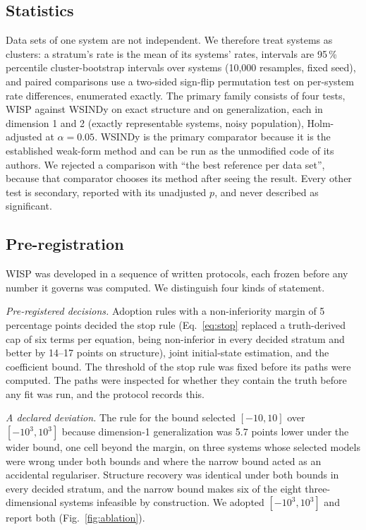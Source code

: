 \documentclass[10pt]{article}
\begin{document}
\subsection{Statistics}
Data sets of one system are not independent. We therefore treat systems as clusters: a stratum's rate is the mean of its
systems' rates, intervals are 95\,\% percentile cluster-bootstrap intervals over systems \cite{field2007} (10,000
resamples, fixed seed), and paired comparisons use a two-sided sign-flip permutation test on per-system rate
differences, enumerated exactly. The primary family consists of four tests, WISP against WSINDy on exact structure and
on generalization, each in dimension 1 and 2 (exactly representable systems, noisy population), Holm-adjusted
\cite{holm1979} at $\alpha=0.05$. WSINDy is the primary comparator because it is the established weak-form method
and can be run as the unmodified code of its authors. We rejected a comparison with ``the best reference per data
set'', because that comparator chooses its method after seeing the result. Every other test is secondary,
reported with its unadjusted $p$, and never described as significant.

\subsection{Pre-registration}
WISP was developed in a sequence of written protocols, each frozen before any number it governs was computed. We
distinguish four kinds of statement.

\emph{Pre-registered decisions.} Adoption rules with a non-inferiority margin of 5 percentage points decided the stop
rule (Eq.~\eqref{eq:stop} replaced a truth-derived cap of six terms per equation, being non-inferior in every decided
stratum and better by 14--17 points on structure), joint initial-state estimation, and the coefficient bound. The
threshold of the stop rule was fixed before its paths were computed. The paths were inspected for whether they contain
the truth before any fit was run, and the protocol records this.

\emph{A declared deviation.} The rule for the bound selected $[-10,10]$ over $[-10^3,10^3]$ because dimension-1
generalization was 5.7 points lower under the wider bound, one cell beyond the margin, on three systems whose selected
models were wrong under both bounds and where the narrow bound acted as an accidental regulariser. Structure recovery
was identical under both bounds in every decided stratum, and the narrow bound makes six of the eight
three-dimensional systems infeasible by construction. We adopted $[-10^3,10^3]$ and report both
(Fig.~\ref{fig:ablation}).
\end{document}
